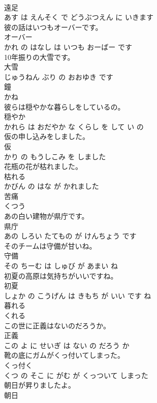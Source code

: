 \documentclass[8pt]{extreport}
\begin{document}
\begin{CJK}{UTF8}{min}
\\	遠足 
\\	あす は えんそく で どうぶつえん に いきます			
\\	彼の話はいつもオーバーです。	
\\	オーバー 
\\	かれ の はなし は いつも おーばー です			
\\	10年振りの大雪です。	
\\	大雪 
\\	じゅうねん ぶり の おおゆき です			
\\	鐘	
\\	かね			
\\	彼らは穏やかな暮らしをしているの。	
\\	穏やか 
\\	かれら は おだやか な くらし を して い の			
\\	仮の申し込みをしました。	
\\	仮 
\\	かり の もうしこみ を しました			
\\	花瓶の花が枯れました。	
\\	枯れる 
\\	かびん の はな が かれました			
\\	苦痛	
\\	くつう			
\\	あの白い建物が県庁です。	
\\	県庁 
\\	あの しろい たてもの が けんちょう です			
\\	そのチームは守備が甘いね。	
\\	守備 
\\	その ちーむ は しゅび が あまい ね			
\\	初夏の高原は気持ちがいいですね。	
\\	初夏 
\\	しょか の こうげん は きもち が いい です ね			
\\	暮れる	
\\	くれる			
\\	この世に正義はないのだろうか。	
\\	正義 
\\	この よ に せいぎ は ない の だろう か			
\\	靴の底にガムがくっ付いてしまった。	
\\	くっ付く 
\\	くつ の そこ に がむ が くっついて しまった			
\\	朝日が昇りましたよ。	
\\	朝日 

\end{CJK}
\end{document}
